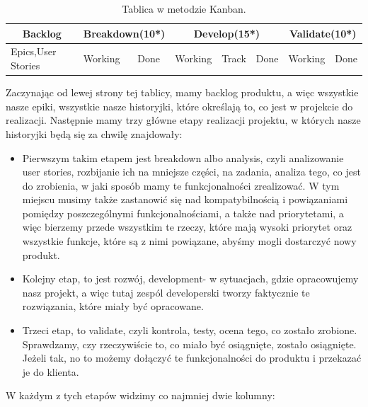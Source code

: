\begin{table}
	\centering\caption{Tablica w metodzie Kanban.}
	\label{tabela:kanban}
	\begin{tabular}{|l|l|l|l|l|l|l|l|}%
		\hline
			\multicolumn{1}{|c|}{\textbf{Backlog}} &\multicolumn{2}{|c|}{\textbf{Breakdown(10*)}} & \multicolumn{3}{|c|}{\textbf{Develop(15*)}} & \multicolumn{2}{|c|}{\textbf{Validate(10*)}} \\
		\hline
		Epics,User Stories & Working
 & Done & Working & Track & Done & Working & Done \\
		\hline
	\end{tabular}
\end{table}

Zaczynając od lewej strony tej tablicy, mamy backlog produktu, a więc wszystkie nasze epiki, wszystkie nasze historyjki, które określają to, co jest w projekcie do realizacji.
Następnie mamy trzy główne etapy realizacji projektu, w których nasze historyjki będą się za chwilę znajdowały:

\begin{itemize}
	\item Pierwszym takim etapem jest breakdown albo analysis, czyli analizowanie user stories, rozbijanie ich na mniejsze części, na zadania, analiza tego, co jest do zrobienia, w jaki sposób mamy te funkcjonalności zrealizować.
	W tym miejscu musimy także zastanowić się nad kompatybilnością i powiązaniami pomiędzy poszczególnymi funkcjonalnościami, a także nad priorytetami, a więc bierzemy przede wszystkim te rzeczy, które mają wysoki priorytet oraz wszystkie funkcje, które są z nimi powiązane, abyśmy mogli dostarczyć nowy produkt. 
	\item Kolejny etap, to jest rozwój, development- w sytuacjach, gdzie opracowujemy nasz projekt, a więc tutaj zespól developerski tworzy faktycznie te rozwiązania, które miały być opracowane.
	\item Trzeci etap, to validate, czyli kontrola, testy, ocena tego, co zostało zrobione. Sprawdzamy, czy rzeczywiście to, co miało być osiągnięte, zostało osiągnięte. Jeżeli tak, no to możemy dołączyć te funkcjonalności do produktu i przekazać je do klienta.
\end{itemize}

W każdym z tych etapów widzimy co najmniej dwie kolumny:

